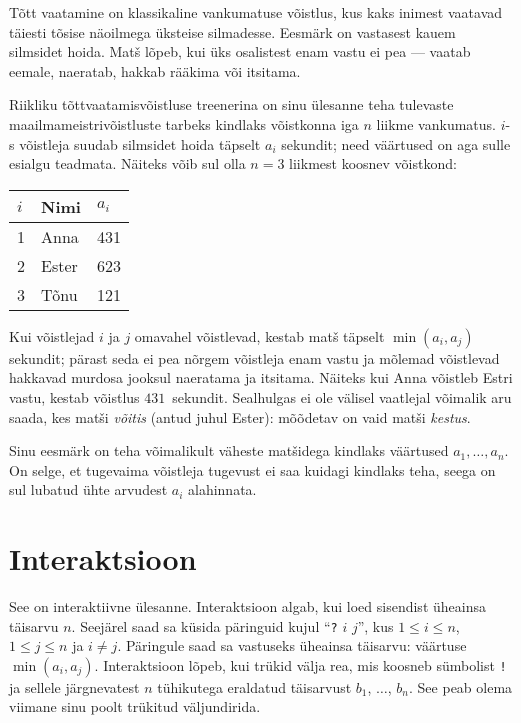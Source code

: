 

\noindent
Tõtt vaatamine on klassikaline vankumatuse võistlus, kus kaks inimest vaatavad täiesti tõsise näoilmega üksteise silmadesse.
Eesmärk on vastasest kauem silmsidet hoida.
Matš lõpeb, kui üks osalistest enam vastu ei pea --- vaatab eemale, naeratab, hakkab rääkima või itsitama.

Riikliku tõttvaatamisvõistluse treenerina on sinu ülesanne teha tulevaste maailmameistrivõistluste tarbeks kindlaks võistkonna iga $n$ liikme vankumatus.
$i$-s võistleja suudab silmsidet hoida täpselt $a_i$ sekundit; need väärtused on aga sulle esialgu teadmata.
Näiteks võib sul olla $n=3$ liikmest koosnev võistkond:

\medskip
\begin{tabular}{lll}
  $i$ & Nimi & $a_i$\\\hline
  1 & Anna &  431 \\
  2 & Ester & 623 \\
  3 & Tõnu &  121\\
\end{tabular}

\medskip
Kui võistlejad $i$ ja $j$ omavahel võistlevad, kestab matš täpselt $\min(a_i, a_j)$ sekundit; pärast seda ei pea nõrgem võistleja enam vastu ja mõlemad võistlevad hakkavad murdosa jooksul naeratama ja
itsitama.
Näiteks kui Anna võistleb Estri vastu, kestab võistlus $431$~sekundit.
Sealhulgas ei ole välisel vaatlejal võimalik aru saada, kes matši \emph{võitis} (antud juhul Ester):
mõõdetav on vaid matši \emph{kestus}.

Sinu eesmärk on teha võimalikult väheste matšidega kindlaks väärtused $a_1,\ldots, a_n$.
On selge, et tugevaima võistleja tugevust ei saa kuidagi kindlaks teha, seega on sul lubatud ühte arvudest $a_i$ alahinnata.

\section*{Interaktsioon}

See on interaktiivne ülesanne.
Interaktsioon algab, kui loed sisendist üheainsa täisarvu $n$.
Seejärel saad sa küsida päringuid kujul ``\texttt{?} $i$ $j$'', kus $1\leq i\leq n$, $1\leq j\leq n$ ja $i\neq j$.
Päringule saad sa vastuseks üheainsa täisarvu: väärtuse $\min(a_i, a_j)$.
Interaktsioon lõpeb, kui trükid välja rea, mis koosneb sümbolist \texttt{!} ja sellele järgnevatest $n$ tühikutega eraldatud täisarvust $b_1$, $\ldots$, $b_n$.
See peab olema viimane sinu poolt trükitud väljundirida.

